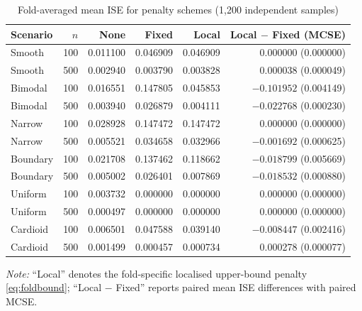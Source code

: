 \begin{table}[htbp]
\centering
\caption{Fold-averaged mean ISE for penalty schemes (1,200 independent samples)}\label{tab:t4}
\small
\setlength{\tabcolsep}{4pt}
\begin{tabular}{lrrrrr}
\toprule
Scenario & \(n\) & None & Fixed & Local & Local \(-\) Fixed (MCSE) \\
\midrule
Smooth & 100 & 0.011100 & 0.046909 & 0.046909 & 0.000000 (0.000000) \\
Smooth & 500 & 0.002940 & 0.003790 & 0.003828 & 0.000038 (0.000049) \\
Bimodal & 100 & 0.016551 & 0.147805 & 0.045853 & \(-0.101952\) (0.004149) \\
Bimodal & 500 & 0.003940 & 0.026879 & 0.004111 & \(-0.022768\) (0.000230) \\
Narrow & 100 & 0.028928 & 0.147472 & 0.147472 & 0.000000 (0.000000) \\
Narrow & 500 & 0.005521 & 0.034658 & 0.032966 & \(-0.001692\) (0.000625) \\
Boundary & 100 & 0.021708 & 0.137462 & 0.118662 & \(-0.018799\) (0.005669) \\
Boundary & 500 & 0.005002 & 0.026401 & 0.007869 & \(-0.018532\) (0.000880) \\
Uniform & 100 & 0.003732 & 0.000000 & 0.000000 & 0.000000 (0.000000) \\
Uniform & 500 & 0.000497 & 0.000000 & 0.000000 & 0.000000 (0.000000) \\
Cardioid & 100 & 0.006501 & 0.047588 & 0.039140 & \(-0.008447\) (0.002416) \\
Cardioid & 500 & 0.001499 & 0.000457 & 0.000734 & 0.000278 (0.000077) \\
\bottomrule
\end{tabular}

\vspace{0.3em}
\footnotesize\textit{Note:} ``Local'' denotes the fold-specific localised upper-bound penalty \eqref{eq:foldbound}; ``Local \(-\) Fixed'' reports paired mean ISE differences with paired MCSE.
\end{table}

